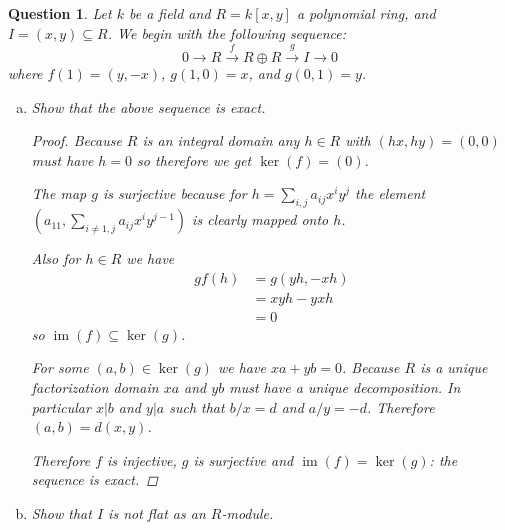 \documentclass{article}
\DeclareMathOperator{\im}{im}
\newtheorem{question}{Question}
\theoremstyle{definition}
\begin{document}
\begin{question}
    Let \(k\) be a field and \(R=k[x,y]\) a polynomial ring, and
    \(I=(x,y)\subseteq R\). We begin with the following sequence:
    \[
        0\to R\overset{f}{\to}R\oplus R\overset{g}{\to}I\to 0
    \]
    where \(f(1)=(y,-x)\), \(g(1,0)=x\), and \(g(0,1)=y\).

    \begin{enumerate}[(a)]
        \item Show that the above sequence is exact.

              \begin{proof}
                  Because \(R\) is an integral domain any \(h\in R\) with
                  \((hx,hy)=(0,0)\) must have \(h=0\) so therefore we get
                  \(\ker(f)=(0)\).

                  The map \(g\) is surjective because for
                  \(h=\sum_{i,j}a_{ij}x^{i}y^{j}\) the element
                  \(\left(a_{11},\sum_{i\neq 1,j}a_{ij}x^{i}y^{j-1}\right)\) is
                  clearly mapped onto \(h\).

                  Also for \(h\in R\) we have
                  \begin{align*}
                      gf(h) & =g(yh,-xh) \\
                            & =xyh-yxh   \\
                            & =0
                  \end{align*}
                  so \(\im(f)\subseteq\ker(g)\).

                  For some \((a,b)\in\ker(g)\) we have \(xa+yb=0\). Because
                  \(R\) is a unique factorization domain \(xa\) and \(yb\) must
                  have a unique decomposition. In particular \(x|b\) and \(y|a\)
                  such that \(b/x=d\) and \(a/y=-d\). Therefore
                  \((a,b)=d(x,y)\).

                  Therefore \(f\) is injective, \(g\) is surjective and
                  \(\im(f)=\ker(g)\): the sequence is exact.
              \end{proof}

        \item Show that \(I\) is not flat as an \(R\)-module.


\end{enumerate}
\end{question}
\end{document}
